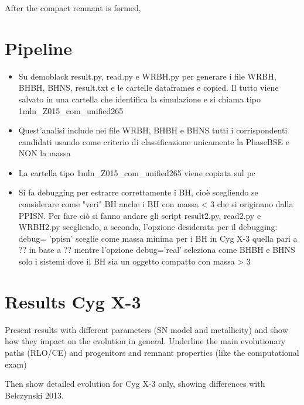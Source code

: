 \documentclass[a4paper,titlepage]{book}     	%
\begin{document}
After the compact remnant is formed, 



\section{Pipeline}
\begin{itemize}
	\item Su demoblack result.py, read.py e WRBH.py per generare i file WRBH, BHBH, BHNS, result.txt e le cartelle dataframes e copied. Il tutto viene salvato in una cartella che identifica la simulazione e si chiama tipo 1mln\_Z015\_com\_unified265
	\item Quest'analisi include nei file WRBH, BHBH e BHNS tutti i corrispondenti candidati usando come criterio di classificazione unicamente la PhaseBSE e NON la massa
	\item La cartella tipo 1mln\_Z015\_com\_unified265 viene copiata sul pc
	\item Si fa debugging per estrarre correttamente i BH, cioè scegliendo se considerare come "veri" BH anche i BH con massa < 3 che si originano dalla PPISN. Per fare ciò si fanno andare gli script result2.py, read2.py e WRBH2.py scegliendo, a seconda, l'opzione desiderata per il debugging: debug= 'ppisn' sceglie come massa minima per i BH in Cyg X-3 quella pari a ?? in base a ?? mentre l'opzione debug='real' seleziona come BHBH e BHNS solo i sistemi dove il BH sia un oggetto compatto con massa > 3
\end{itemize}





\section{Results Cyg X-3}
Present results with different parameters (SN model and metallicity) and show how they impact on the evolution in general. Underline the main evolutionary paths (RLO/CE) and progenitors and remnant properties (like the computational exam)

Then show detailed evolution for Cyg X-3 only, showing differences with Belczynski 2013.





\printbibliography[heading=bibintoc]
\end{document}
